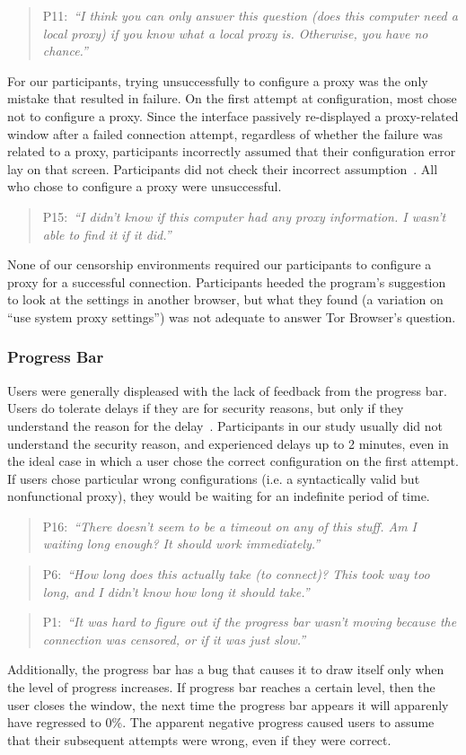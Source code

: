 \documentclass[USenglish,oneside,twocolumn]{article}
\newcommand{\pquote}[2]{
\begin{quotation}
\noindent #1:~\textit{``#2''}
\end{quotation}
}
\begin{document}
\pquote{P11}{I think you can only answer this question (does this computer need a local proxy) if you know what a local proxy is. Otherwise, you have no chance.}

For our participants, trying unsuccessfully to configure a proxy was the only mistake that resulted in failure. On the first attempt at configuration, most chose not to configure a proxy. Since the interface passively re-displayed a proxy-related window after a failed connection attempt, regardless of whether the failure was related to a proxy, participants incorrectly assumed that their configuration error lay on that screen. Participants did not check their incorrect assumption~\cite{wason1960failure}. All who chose to configure a proxy were unsuccessful. 

\pquote{P15}{I didn't know if this computer had any proxy information. I wasn't able to find it if it did.}

None of our censorship environments required our participants to configure a proxy for a successful connection. Participants heeded the program's suggestion to look at the settings in another browser, but what they found (a variation on ``use system proxy settings'') was not adequate to answer Tor Browser's question.

\subsubsection{Progress Bar} 
Users were generally displeased with the lack of feedback from the progress bar. Users do tolerate delays if they are for security reasons, but only if they understand the reason for the delay~\cite{egelmanplease}. Participants in our study usually did not understand the security reason, and experienced delays up to 2 minutes, even in the ideal case in which a user chose the correct configuration on the first attempt. If users chose particular wrong configurations (i.e. a syntactically valid but nonfunctional proxy), they would be waiting for an indefinite period of time. 

\pquote{P16}{There doesn't seem to be a timeout on any of this stuff. Am I waiting long enough? It should work immediately.}
\pquote{P6}{How long does this actually take (to connect)? This took way too long, and I didn't know how long it should take.}
\pquote{P1}{It was hard to figure out if the progress bar wasn't moving because the connection was censored, or if it was just slow.}

Additionally, the progress bar has a bug
that causes it to draw itself only when the level of progress increases.
If progress bar reaches a certain level,
then the user closes the window,
the next time the progress bar appears it will apparenly have regressed to 0\%.
The apparent negative progress caused users to assume that their subsequent attempts were wrong, even if they were correct. 
\end{document}
